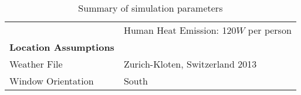 \begin{table*}
\begin{tabular*}{\textwidth}{ll}
                              & Human Heat Emission: 120$W$ per person                                       \\
\textbf{Location Assumptions} &                                        \\
Weather File                  & Zurich-Kloten, Switzerland 2013 \cite{remund1997meteonorm}       \\
Window Orientation                   & South                                  \\
\hline
\end{tabular*}
\caption{Summary of simulation parameters}
\label{tab:AssumptionsOpp}
\end{table*}





